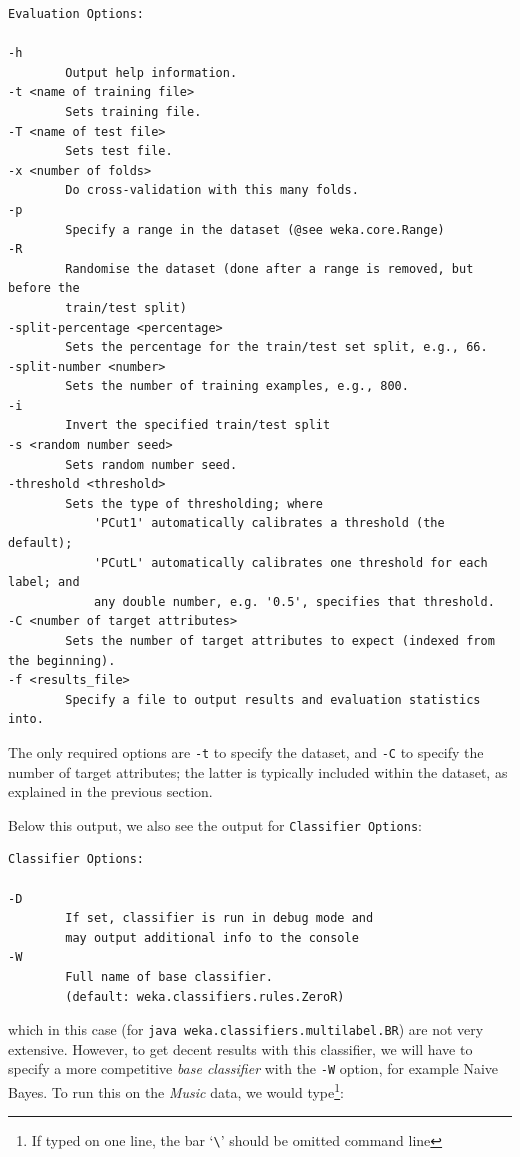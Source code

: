 \documentclass[11pt]{article}
\begin{document}
{\small
\begin{verbatim}
Evaluation Options:

-h
        Output help information.
-t <name of training file>
        Sets training file.
-T <name of test file>
        Sets test file.
-x <number of folds>
        Do cross-validation with this many folds.
-p
        Specify a range in the dataset (@see weka.core.Range)
-R
        Randomise the dataset (done after a range is removed, but before the 
        train/test split)
-split-percentage <percentage>
        Sets the percentage for the train/test set split, e.g., 66.
-split-number <number>
        Sets the number of training examples, e.g., 800.
-i
        Invert the specified train/test split
-s <random number seed>
        Sets random number seed.
-threshold <threshold>
        Sets the type of thresholding; where 
            'PCut1' automatically calibrates a threshold (the default); 
            'PCutL' automatically calibrates one threshold for each label; and 
            any double number, e.g. '0.5', specifies that threshold.
-C <number of target attributes>
        Sets the number of target attributes to expect (indexed from the beginning).
-f <results_file>
        Specify a file to output results and evaluation statistics into.
\end{verbatim}
}

The only required options are \texttt{-t} to specify the dataset, and \texttt{-C} to specify the number of target attributes; the latter is typically included within the dataset, as explained in the previous section. 

Below this output, we also see the output for \texttt{Classifier Options}:

{\small
\begin{verbatim}
Classifier Options:

-D
        If set, classifier is run in debug mode and
        may output additional info to the console
-W
        Full name of base classifier.
        (default: weka.classifiers.rules.ZeroR)
\end{verbatim}
}

which in this case (for \texttt{java weka.classifiers.multilabel.BR}) are not very extensive. However, to get decent results with this classifier, we will have to specify a more competitive \emph{base classifier} with the \texttt{-W} option, for example Naive Bayes. To run this on the \textit{Music} data, we would type\footnote{If typed on one line, the bar `\texttt{\textbackslash}' should be omitted command line}:
\end{document}
